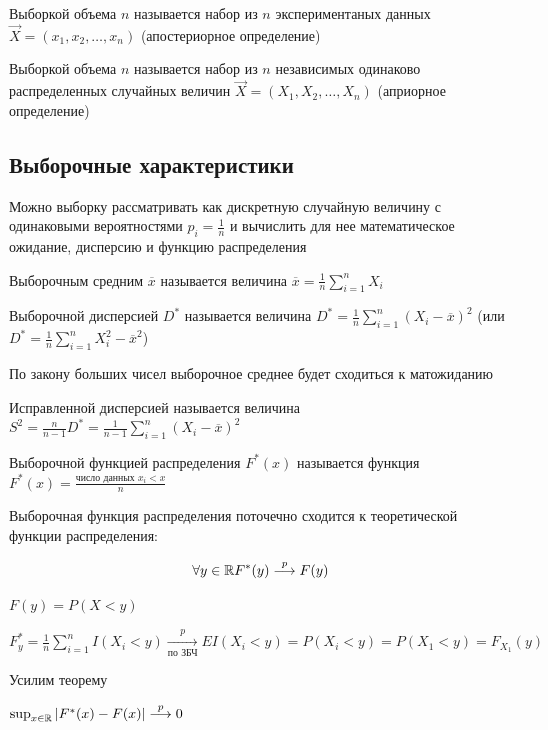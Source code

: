\documentclass[12pt]{article}
\begin{document}
 Выборкой объема $n$ называется набор из $n$ экспериментаных данных $\vec{X} = (x_1, x_2, \dots, x_n)$ (апостериорное определение)

 Выборкой объема $n$ называется набор из $n$ независимых одинаково распределенных случайных
величин $\vec{X} = (X_1, X_2, \dots, X_n)$ (априорное определение)

\subsection{Выборочные характеристики}

Можно выборку рассматривать как дискретную случайную величину с одинаковыми вероятностями $p_i = \frac{1}{n}$
и вычислить для нее математическое ожидание, дисперсию и функцию распределения

\Def Выборочным средним $\overline{x}$ называется величина $\overline{x} = \frac{1}{n} \sum_{i = 1}^n X_i$

\Defs Выборочной дисперсией $D^*$ называется величина $D^* = \frac{1}{n} \sum_{i = 1}^n (X_i - \overline{x})^2$ (или $D^* = \frac{1}{n} \sum_{i = 1}^n X_i^2 - \overline{x}^2$)

По закону больших чисел выборочное среднее будет сходиться к матожиданию

\Defs Исправленной дисперсией называется величина $S^2 = \frac{n}{n - 1} D^* = \frac{1}{n - 1}\sum_{i = 1}^n (X_i - \overline{x})^2$

\hypertarget{selective_distribution_function}{}

\Def Выборочной функцией распределения $F^*(x)$ называется функция $F^*(x) = \frac{\text{число данных } x_i < x}{n}$

\begin{MyTheorem}
    \Ths Выборочная функция распределения поточечно сходится к теоретической функции распределения:

    \[\forall y \in \mathbb{R} F^*(y) \overset{p}{\longrightarrow} F(y)\]
\end{MyTheorem}

\begin{MyProof}
    $F(y) = P(X < y)$

    $F^*_y = \frac{1}{n} \sum_{i = 1}^n I(X_i < y) \underset{\text{по ЗБЧ}}{\overset{p}{\longrightarrow}} EI(X_i < y) = P(X_i < y) = 
    P(X_1 < y) = F_{X_1}(y)$
\end{MyProof}

Усилим теорему

\begin{MyTheorem}
     $\sup_{x \in \mathbb{R}} |F^*(x) - F(x)| \overset{p}{\longrightarrow} 0$
\end{MyTheorem}
\end{document}
